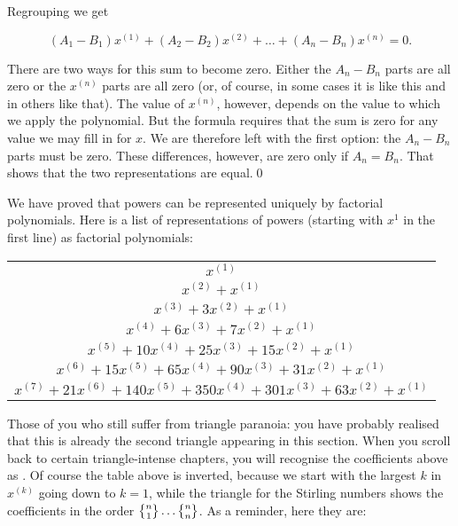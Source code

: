\documentclass[tikz]{scrreprt}
\begin{document}
Regrouping we get

\begin{equation}
(A_1-B_1)x^{(1)} + (A_2-B_2)x^{(2)} + \dots + (A_n-B_n)x^{(n)} = 0.
\end{equation}

There are two ways for this sum to become zero.
Either the $A_n-B_n$ parts are all zero or
the $x^{(n)}$ parts are all zero (or, of course,
in some cases it is like this and in others
like that).
The value of $x^{(n)}$, however,
depends on the value
to which we apply the polynomial.
But the formula requires that the sum
is zero for any value we may fill in for $x$.
We are therefore left with the first option:
the $A_n-B_n$ parts must be zero.
These differences, however, are zero
only if $A_n = B_n$.
That shows that the two representations are equal.\qed

We have proved that powers can be represented
uniquely by factorial polynomials. Here is a list
of representations of powers (starting with $x^1$
in the first line) as factorial polynomials:

\begin{center}
\begin{tabular}{c}
$x^{(1)}$ \\
$x^{(2)} + x^{(1)}$ \\
$x^{(3)} + 3x^{(2)} + x^{(1)}$\\
$x^{(4)} + 6x^{(3)} + 7x^{(2)} + x^{(1)}$\\
$x^{(5)} + 10x^{(4)} + 25x^{(3)} +15x^{(2)} + x^{(1)}$ \\
$x^{(6)} + 15x^{(5)} + 65x^{(4)} + 90x^{(3)} + 31x^{(2)} + x^{(1)}$ \\
$x^{(7)} + 21x^{(6)} + 140x^{(5)} + 350x^{(4)} + 301x^{(3)} + 63x^{(2)} + x^{(1)}$  
\end{tabular}
\end{center}

Those of you who still suffer from triangle paranoia:
you have probably realised that this is already the second
triangle appearing in this section.
When you scroll back to certain triangle-intense chapters,
you will recognise the coefficients above as 
.
Of course the table above is inverted, because we start
with the largest $k$ in $x^{(k)}$ going down to $k=1$,
while the triangle for the Stirling numbers shows
the coefficients in the order 
$\stirlingTwo{n}{1} \dots \stirlingTwo{n}{n}$.
As a reminder, here they are:
\end{document}

